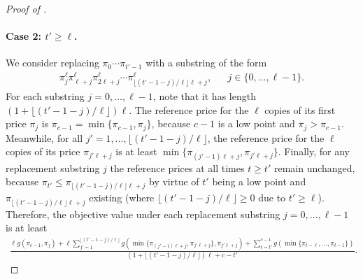 \documentclass[format=acmsmall, review=false]{acmart}
\begin{document}
\begin{proof}[Proof of ]
\paragraph{Case 2: $t'\ge\ell$.}
We consider replacing $\pi_0\cdots\pi_{t'-1}$ with a substring of the form
\begin{align} \label{eqn:substrings}
\pi_j^\ell \pi_{\ell+j}^\ell\pi_{2\ell+j}^\ell\cdots\pi_{\lfloor (t'-1-j)/\ell\rfloor\ell+j}^\ell, && j\in\{0,\ldots,\ell-1\}.
\end{align}
For each substring $j=0,\ldots,\ell-1$, note that it has length $(1+\lfloor (t'-1-j)/\ell\rfloor)\ell$.
The reference price for the $\ell$ copies of its first price $\pi_j$ is $\pi_{c-1}=\min\{\pi_{c-1},\pi_j\}$, because $c-1$ is a low point and $\pi_j>\pi_{c-1}$.
Meanwhile, for all $j'=1,\ldots,\lfloor (t'-1-j)/\ell\rfloor$, the reference price for the $\ell$ copies of its price $\pi_{j'\ell+j}$ is at least $\min\{\pi_{(j'-1)\ell+j},\pi_{j'\ell+j}\}$.
Finally, for any replacement substring $j$ the reference prices at all times $t\ge t'$ remain unchanged, because $\pi_{t'}\le\pi_{\lfloor (t'-1-j)/\ell\rfloor\ell+j}$ by virtue of $t'$ being a low point and $\pi_{\lfloor (t'-1-j)/\ell\rfloor\ell+j}$ existing (where $\lfloor (t'-1-j)/\ell\rfloor\ge0$ due to $t'\ge\ell$).
Therefore, the objective value under each replacement substring $j=0,\ldots,\ell-1$ is at least
\begin{align*}
\frac{\ell g(\pi_{c-1},\pi_j)
+\ell\sum_{j'=1}^{\lfloor (t'-1-j)/\ell\rfloor} g(\min\{\pi_{(j'-1)\ell+j},\pi_{j'\ell+j}\},\pi_{j'\ell+j})+\sum_{t=t'}^{c-1}g(\min\{\pi_{t-\ell},\ldots,\pi_{t-1}\})}{(1+\lfloor (t'-1-j)/\ell\rfloor)\ell+c-t'}.
\end{align*}


\end{proof}
\end{document}
